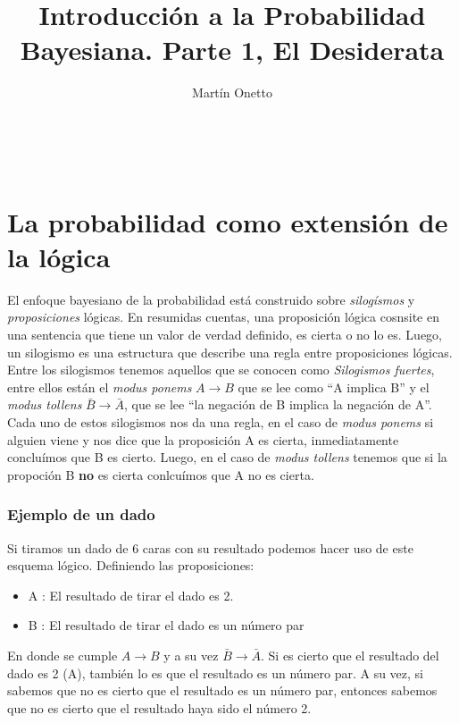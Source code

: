 \documentclass[aps,onecolumn,12pt,notitlepage]{revtex4-1}
\begin{document}
\renewcommand{\andname}{y}
\renewcommand{\tablename}{Tabla}
\renewcommand{\labelenumi}{\Roman{enumi}.}

\title{Introducción a la Probabilidad Bayesiana.  Parte 1, El Desiderata}
\author{Martín Onetto} 
\maketitle
\

\section{La probabilidad como extensión de la lógica}

El enfoque bayesiano de la probabilidad está construido sobre \textit{silogísmos} y \textit{proposiciones} lógicas. En resumidas cuentas, una proposición lógica cosnsite en una sentencia que tiene un valor de verdad definido, es cierta o no lo es. Luego, un silogismo es una estructura que describe una regla entre proposiciones lógicas. Entre los silogismos tenemos aquellos que se conocen como \textit{Silogismos fuertes}, entre ellos están el \textit{modus ponems} $A\rightarrow B$ que se lee como ``A implica B'' y el \textit{modus tollens} $\bar{B} \rightarrow \bar{A}$, que se lee ``la negación de B implica la negación de A''.
Cada uno de estos silogismos nos da una regla, en el caso de \textit{modus ponems} si alguien viene y nos dice que la proposición A es cierta, inmediatamente concluímos que B es cierto. Luego, en el caso de \textit{modus tollens} tenemos que si la propoción B \textbf{no} es cierta conlcuímos que A no es cierta. 

\subsubsection{Ejemplo de un dado}
Si tiramos un dado  de 6 caras con su resultado podemos hacer uso de este esquema lógico. Definiendo las proposiciones:
\begin{itemize}
\item A : El resultado de tirar el dado es 2.
\item B	: El resultado de tirar el dado es un número par
\end{itemize}
En donde se cumple $A\rightarrow B$ y a su vez $\bar{B} \rightarrow \bar{A}$. Si es cierto que el resultado del dado es 2 (A), también lo es que el resultado es un número par. A su vez, si sabemos que no es cierto que el resultado es un número par, entonces sabemos que no es cierto que el resultado haya sido el número 2.
\end{document}
